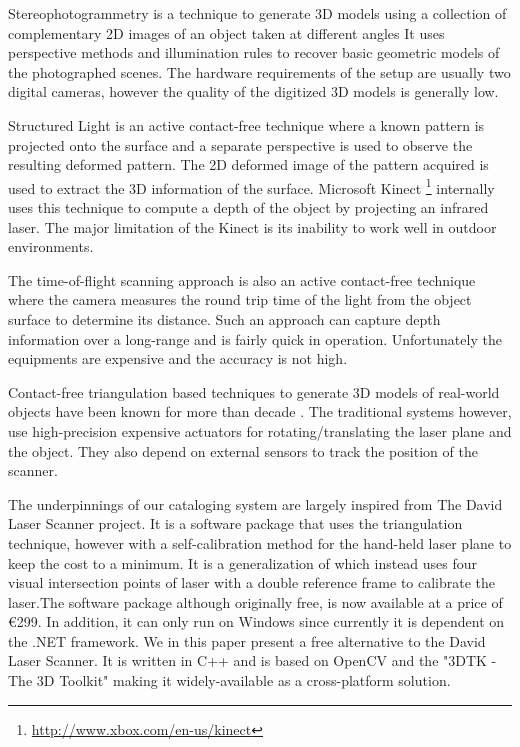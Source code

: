 Stereophotogrammetry \cite{li:2004, debevec:1996} is a technique to generate
3D models using a collection of complementary 2D images of an object taken at
different angles It uses perspective methods and illumination rules to recover
basic geometric models of the photographed scenes. The hardware requirements
of the setup are usually two digital cameras, however the quality of the
digitized 3D models is generally low.

Structured Light is an active contact-free technique where a known pattern is
projected onto the surface and a separate perspective is used to observe the
resulting deformed pattern. The 2D deformed image of the pattern acquired is
used to extract the 3D information of the surface. Microsoft Kinect
\footnote{\href{http://www.xbox.com/en-us/kinect}{http://www.xbox.com/en-us/kinect}}
internally uses this technique to compute a depth of the object by projecting
an infrared laser. The major limitation of the Kinect is its inability to work
well in outdoor environments.

The time-of-flight scanning approach \cite{nielsen:1996} is also
an active contact-free technique where the camera measures the round trip time
of the light from the object surface to determine its distance. Such an
approach can capture depth information over a long-range and is fairly quick
in operation. Unfortunately the equipments are expensive and the accuracy is
not high.

Contact-free triangulation based techniques to generate 3D models of
real-world objects have been known for more than decade \cite{beraldin:1999,
cortelazzo:2004}. The traditional systems however, use high-precision
expensive actuators for rotating/translating the laser plane and the object.
They also depend on external sensors to track the position of the scanner.

The underpinnings of our cataloging system are largely inspired from The David
Laser Scanner \cite{winkelbach:2006} project.  It is a software package that
uses the triangulation technique, however with a self-calibration method for
the hand-held laser plane to keep the cost to a minimum. It is a
generalization of \cite{zagorchev:2006} which instead uses four visual
intersection points of laser with a double reference frame to calibrate the
laser.The software package although originally free, is now available at a
price of \euro 299. In addition, it can only run on Windows since currently it
is dependent on the .NET framework. We in this paper present a free
alternative to the David Laser Scanner. It is written in C++ and is based on
OpenCV and the "3DTK - The 3D Toolkit" \cite{3dtk:2012} making it
widely-available as a cross-platform solution.

